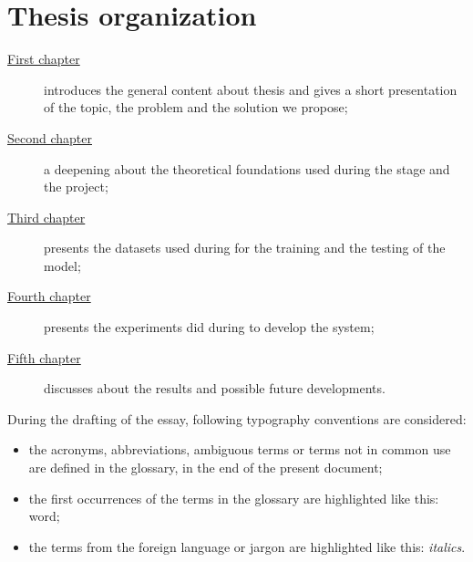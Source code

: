 \section{Thesis organization}\label{sec:thesis-organization}
\begin{description}
    \item[{\hyperref[ch:introduction]{First chapter}}] introduces the general content about thesis and gives a short presentation of the topic, the problem and the solution we propose;

    \item[{\hyperref[ch:background]{Second chapter}}] a deepening about the theoretical foundations used during the stage and the project;

    \item[{\hyperref[ch:methodology]{Third chapter}}] presents the datasets used during for the training and the testing of the model;

    \item[{\hyperref[ch:experimental-results]{Fourth chapter}}] presents the experiments did during to develop the system;

    \item[{\hyperref[ch:conclusions]{Fifth chapter}}] discusses about the results and possible future developments.
\end{description}
During the drafting of the essay, following typography conventions are considered:
\begin{itemize}
    \item the acronyms, abbreviations, ambiguous terms or terms not in common use are defined in the glossary, in the end of the present document;
    \item the first occurrences of the terms in the glossary are highlighted like this: \gls{word};
    \item the terms from the foreign language or jargon are highlighted like this: \emph{italics}.
\end{itemize}